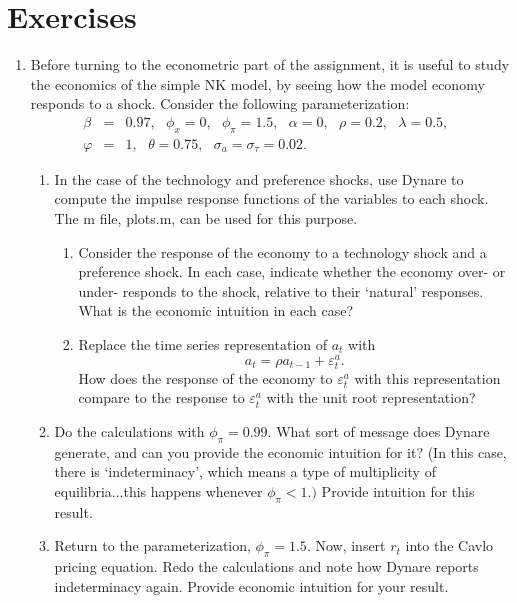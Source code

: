 \documentclass[12pt,thmsa]{article}
\begin{document}
\section{Exercises}

\begin{enumerate}
\item Before turning to the econometric part of the assignment, it is useful
to study the economics of the simple NK model, by seeing how the model
economy responds to a shock. Consider the following parameterization:%
\begin{eqnarray*}
\beta &=&0.97,\text{ }\phi _{x}=0,\text{ }\phi _{\pi }=1.5,\text{ }\alpha =0,%
\text{ }\rho =0.2,\text{ }\lambda =0.5,\text{ } \\
\varphi &=&1,\text{ }\theta =0.75,\text{ }\sigma _{a}=\sigma _{\tau }=0.02.
\end{eqnarray*}

\begin{enumerate}
\item In the case of the technology and preference shocks, use Dynare to
compute the impulse response functions of the variables to each shock. The m
file, plots.m, can be used for this purpose.

\begin{enumerate}
\item Consider the response of the economy to a technology shock and a
preference shock. In each case, indicate whether the economy over- or under-
responds to the shock, relative to their `natural' responses. What is the
economic intuition in each case?

\item Replace the time series representation of $a_{t}$ with%
\begin{equation*}
a_{t}=\rho a_{t-1}+\varepsilon _{t}^{a}.
\end{equation*}%
How does the response of the economy to $\varepsilon _{t}^{a}$ with this
representation compare to the response to $\varepsilon _{t}^{a}$ with the
unit root representation?
\end{enumerate}

\item Do the calculations with $\phi _{\pi }=0.99.$ What sort of message
does Dynare generate, and can you provide the economic intuition for it? (In
this case, there is `indeterminacy', which means a type of multiplicity of
equilibria...this happens whenever $\phi _{\pi }<1.)$ Provide intuition for
this result.

\item Return to the parameterization, $\phi _{\pi }=1.5.$ Now, insert $r_{t}$
into the Cavlo pricing equation. Redo the calculations and note how Dynare
reports indeterminacy again. Provide economic intuition for your result.


\end{enumerate}
\end{enumerate}
\end{document}
